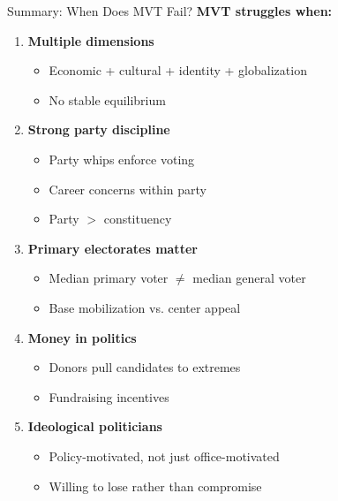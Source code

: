 \documentclass[10pt]{beamer}
\begin{document}
\begin{frame}{Summary: When Does MVT Fail?}
\textbf{MVT struggles when:}

\begin{enumerate}
\item \textbf{Multiple dimensions}
\begin{itemize}
\item Economic + cultural + identity + globalization
\item No stable equilibrium
\end{itemize}


\item \textbf{Strong party discipline}
\begin{itemize}
\item Party whips enforce voting
\item Career concerns within party
\item Party $>$ constituency
\end{itemize}


\item \textbf{Primary electorates matter}
\begin{itemize}
\item Median primary voter $\neq$ median general voter
\item Base mobilization vs. center appeal
\end{itemize}


\item \textbf{Money in politics}
\begin{itemize}
\item Donors pull candidates to extremes
\item Fundraising incentives
\end{itemize}


\item \textbf{Ideological politicians}
\begin{itemize}
\item Policy-motivated, not just office-motivated
\item Willing to lose rather than compromise
\end{itemize}
\end{enumerate}
\end{frame}
\end{document}

